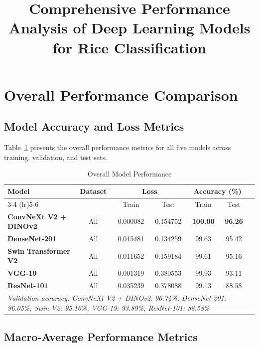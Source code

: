 \documentclass[11pt,a4paper]{article}
\title{\textbf{Comprehensive Performance Analysis of Deep Learning Models for Rice Classification}}
\author{}
\date{}
\begin{document}
\maketitle



\section{Overall Performance Comparison}

\subsection{Model Accuracy and Loss Metrics}

Table~\ref{tab:overall} presents the overall performance metrics for all five models across training, validation, and test sets.

\begin{table}[H]
\centering
\caption{Overall Model Performance}
\label{tab:overall}
\begin{tabular}{p{4.5cm}cccccc}
\toprule
\multirow{2}{*}{\textbf{Model}} & \multirow{2}{*}{\textbf{Dataset}} & \multicolumn{2}{c}{\textbf{Loss}} & \multicolumn{2}{c}{\textbf{Accuracy (\%)}} \\
\cmidrule(lr){3-4} \cmidrule(lr){5-6}
& & Train & Test & Train & Test \\
\midrule
\textbf{ConvNeXt V2 + DINOv2} & All & 0.000082 & 0.154752 & \textbf{100.00} & \textbf{96.26} \\
\textbf{DenseNet-201} & All & 0.015481 & 0.134259 & 99.63 & 95.42 \\
\textbf{Swin Transformer V2} & All & 0.011652 & 0.159184 & 99.61 & 95.16 \\
\textbf{VGG-19} & All & 0.001319 & 0.380553 & 99.93 & 93.11 \\
\textbf{ResNet-101} & All & 0.035239 & 0.378088 & 99.13 & 88.58 \\
\midrule
\multicolumn{6}{p{14cm}}{\textit{Validation accuracy: ConvNeXt V2 + DINOv2: 96.74\%, DenseNet-201: 96.05\%, Swin V2: 95.16\%, VGG-19: 93.89\%, ResNet-101: 88.58\%}} \\
\bottomrule
\end{tabular}
\end{table}

\subsection{Macro-Average Performance Metrics}
\end{document}
